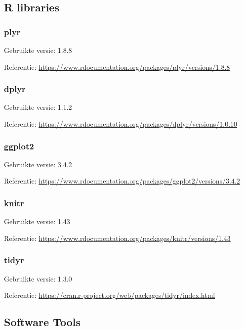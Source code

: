 \documentclass[
]{article}
\begin{document}
\hypertarget{r-libraries}{%
\subsection{R libraries}\label{r-libraries}}

\hypertarget{plyr}{%
\subsubsection{plyr}\label{plyr}}

Gebruikte versie: 1.8.8

Referentie:
\url{https://www.rdocumentation.org/packages/plyr/versions/1.8.8}

\hypertarget{dplyr}{%
\subsubsection{dplyr}\label{dplyr}}

Gebruikte versie: 1.1.2

Referentie:
\url{https://www.rdocumentation.org/packages/dplyr/versions/1.0.10}

\hypertarget{ggplot2}{%
\subsubsection{\texorpdfstring{\textbf{ggplot2}}{ggplot2}}\label{ggplot2}}

Gebruikte versie: 3.4.2

Referentie:
\url{https://www.rdocumentation.org/packages/ggplot2/versions/3.4.2}

\hypertarget{knitr}{%
\subsubsection{\texorpdfstring{\textbf{knitr}}{knitr}}\label{knitr}}

Gebruikte versie: 1.43

Referentie:
\url{https://www.rdocumentation.org/packages/knitr/versions/1.43}

\hypertarget{tidyr}{%
\subsubsection{tidyr}\label{tidyr}}

Gebruikte versie: 1.3.0

Referentie: \url{https://cran.r-project.org/web/packages/tidyr/index.html}

\hypertarget{software-tools}{%
\subsection{Software Tools}\label{software-tools}}
\end{document}
